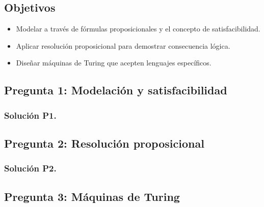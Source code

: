 \documentclass{article}
\begin{document}
\subsection*{Objetivos}
\begin{itemize}
    \item Modelar a través de fórmulas proposicionales y el concepto de satisfacibilidad.
    \item Aplicar resolución proposicional para demostrar consecuencia lógica.
    \item Diseñar máquinas de Turing que acepten lenguajes específicos.
\end{itemize}

\subsection*{Pregunta 1: Modelación y satisfacibilidad}

\subsubsection*{Solución P1.}


\subsection*{Pregunta 2: Resolución proposicional}

\subsubsection*{Solución P2.}


\subsection*{Pregunta 3: Máquinas de Turing}

\end{document}
